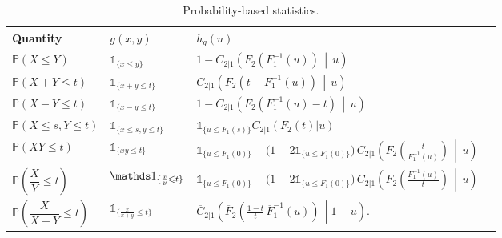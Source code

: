 \documentclass[12pt]{article}
\begin{document}
\begin{table}[H]
\centering
\caption{Probability-based statistics.}
\renewcommand{\arraystretch}{1.25}
\begin{tabular}{llll}
\hline
Quantity & $g(x,y)$ & $h_g(u)$\\
\hline

$\mathbb P(X\leqslant Y)$
&
$\mathds 1_{\{x\leqslant y\}}$
&
$
1-
C_{2|1}
\!\left(
F_2(F_1^{-1}(u))
\,\middle|\,
u
\right)
$
\\

$\mathbb P(X+Y\leqslant t)$
&
$\mathds 1_{\{x+y\leqslant t\}}$
&
$
C_{2|1}
\!\left(
F_2(t-F_1^{-1}(u))
\,\middle|\,
u
\right)
$
\\

$\mathbb P(X-Y\leqslant t)$
&
$\mathds 1_{\{x-y\leqslant t\}}$
&
$\displaystyle
1-
C_{2|1}
\!\left(
F_2(F_1^{-1}(u)-t)
\,\middle|\,
u
\right)
$
\\

$\mathbb P(X\leqslant s,Y\leqslant t)$
&
$\mathds 1_{\{x\leqslant s,y\leqslant t\}}$
&
$\displaystyle
\mathds 1_{\{u\leqslant F_1(s)\}}
C_{2|1}(F_2(t)|u)
$
\\

$\mathbb P(XY\leqslant t)$
&
$\mathds 1_{\{xy\leqslant t\}}$
&
$\mathds 1_{ \{u\leqslant F_1(0)\} }
+
\bigl(1-2\mathds 1_{\{u\leqslant F_1(0)\}}\bigr)
\,C_{2|1}
\!\left(
F_2\!\left(
\frac{t}{F_1^{-1}(u)}
\right)
\,\middle|\,u
\right)
$
\\
$\mathbb P\left(\dfrac{X}{Y}\leqslant t\right)$
&
$\mathds 1_{\{{x\over y}\leqslant t\}}$
&
$\mathds 1_{\{u\leqslant F_1(0)\}}
+
\bigl(1-2\mathds 1_{\{u\leqslant F_1(0)\}}\bigr)
\,C_{2|1}
\!\left(
F_2\!\left(
\frac{F_1^{-1}(u)}{t}
\right)
\,\middle|\,u
\right)
$
\\
$\mathbb P\left(\dfrac{X}{X+Y}\leqslant t\right)$
&
$\mathds 1_{\{\frac{x}{x+y}\leqslant t\}}$
&
$            \overline C_{2|1} \left(\overline{F}_2 \left(
			\frac{1-t}{t}\,
			\overline{F}_1^{-1}(u)
			\right) \,\middle| 1-u \right). 
		$
\\[2mm]
\hline
\end{tabular}
\label{Table-2}
\end{table}
\end{document}
